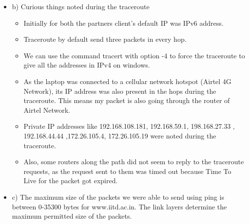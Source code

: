 \documentclass{article}
\begin{document}
\begin{itemize}
    \item b) Curious things noted during the traceroute

    \begin{itemize}
        \item Initially for both the partners client's default IP  was IPv6 address.
        \item Traceroute by default send three packets in every hop.
        \item We can use the command tracert with option -4 to force the traceroute to give all the addresses in IPv4 on windows.
        \item As the laptop was connected to a cellular network hotspot (Airtel 4G Network), its IP address was also present in the hops during the traceroute. This means my packet is also going through the router of Airtel Network. 
        \item Private IP addresses like 192.168.108.181, 192.168.59.1, 198.168.27.33 , 192.168.44.44 ,172.26.105.4, 172.26.105.19  were noted during the traceroute. 
        \item Also, some routers along the path did not seem to reply to the traceroute requests, as the request sent to them was timed out because Time To Live for the packet got expired.
    \end{itemize} 

    \item c) The maximum size of the packets we were able to send using ping is between 0-35300 bytes for www.iitd.ac.in. The link layers determine the maximum permitted size of the packets.
    
\end{itemize}
\end{document}
